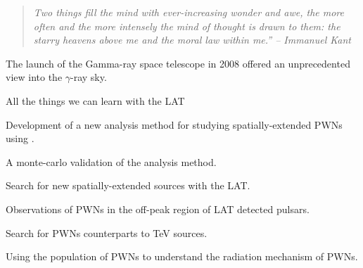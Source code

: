 
\begin{quote}
\em{Two things fill the mind with ever-increasing wonder and awe,
the more often and the more intensely the mind of thought is drawn to
them: the starry heavens above me and the moral law within me.'' -- Immanuel Kant}
\end{quote}

The launch of the \fermi Gamma-ray space telescope in 2008 offered
an unprecedented view into the $\gamma$-ray sky.

All the things we can learn with the \ac{LAT}

Development of a new analysis method for studying spatially-extended \acp{PWN}
using \pointlike.

A monte-carlo validation of the analysis method.

Search for new spatially-extended sources with the \ac{LAT}.

Observations of \acp{PWN} in the off-peak region of \ac{LAT} detected pulsars.

Search for \acp{PWN} counterparts to TeV sources.

Using the population of \acp{PWN} to understand the radiation mechanism of \acp{PWN}.
